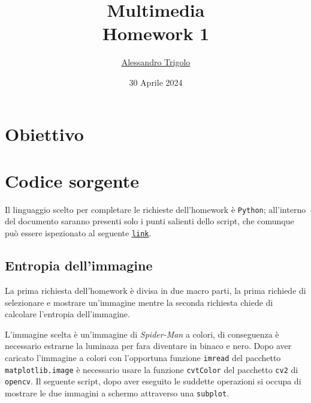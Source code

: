 \title{\vspace{160px} \textbf{\huge{Multimedia}} \\\vspace{17.5px} \LARGE{Homework 1}  \vspace{10px}}
\author{\href{https://github.com/imAlessas}{Alessandro Trigolo}}
\date{30 Aprile 2024}



\maketitle\newpage

\tableofcontents
\listoffigures
\vspace{20px}
\newpage

\listoftodos\newpage


\section{Obiettivo}



\vspace{30px}\section{Codice sorgente}
Il linguaggio scelto per completare le richieste dell'homework è \texttt{Python}; all'interno del documento saranno presenti solo i punti salienti dello script, che comunque può essere ispezionato al seguente \href{https://github.com/imAlessas/computer-networks/blob/main/multimedia/hw-1/script/lossless_coding.py}{\texttt{link}}.



\vspace{15px}\subsection{Entropia dell'immagine}
La prima richiesta dell'homework è divisa in due macro parti, la prima richiede di selezionare e mostrare un'immagine mentre la seconda richiesta chiede di calcolare l'entropia dell'immagine.

L'immagine scelta è un'immagine di \textsl{Spider-Man} a colori, di conseguenza è necessario estrarne la luminaza per fara diventare in binaco e nero. Dopo aver caricato l'immagine a colori con l'opportuna funzione \texttt{imread} del pacchetto \texttt{matplotlib.image} è necessario usare la funzione \texttt{cvtColor} del pacchetto \texttt{cv2} di \texttt{opencv}. Il seguente script, dopo aver eseguito le suddette operazioni si occupa di mostrare le due immagini a schermo attraverso una \texttt{subplot}.

